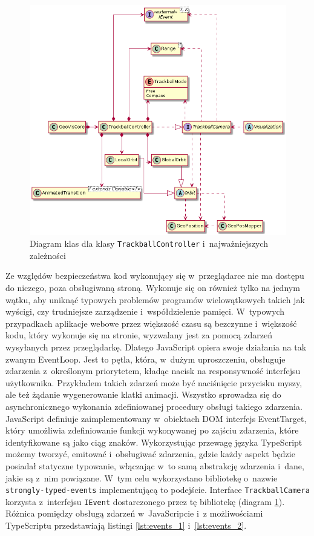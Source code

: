 \begin{figure}
    \centering
    \includegraphics[width=\linewidth]{diagrams/out/c3_trackball.png}
    \caption{Diagram klas dla klasy \texttt{TrackballController} i~najważniejszych zależności}
    \label{fig:c3_trackball}
\end{figure}

Ze względów bezpieczeństwa kod wykonujący się w~przeglądarce nie ma dostępu do niczego, poza obsługiwaną stroną. Wykonuje się on również tylko na jednym wątku, aby uniknąć typowych problemów programów wielowątkowych takich jak wyścigi, czy trudniejsze zarządzenie i~współdzielenie pamięci. W~typowych przypadkach aplikacje webowe przez większość czasu są bezczynne i~większość kodu, który wykonuje się na stronie, wyzwalany jest za pomocą zdarzeń wysyłanych przez przeglądarkę. Dlatego JavaScript opiera swoje działania na tak zwanym EventLoop. Jest to pętla, która, w~dużym uproszczeniu, obsługuje zdarzenia z~określonym priorytetem, kładąc nacisk na responsywność interfejsu użytkownika. Przykładem takich zdarzeń może być naciśnięcie przycisku myszy, ale też żądanie wygenerowanie klatki animacji. Wszystko sprowadza się do asynchronicznego wykonania zdefiniowanej procedury obsługi takiego zdarzenia. JavaScript definiuje zaimplementowany w~obiektach DOM interfejs EventTarget\cite{JsEvents}, który umożliwia zdefiniowanie funkcji wykonywanej po zajściu zdarzenia, które identyfikowane są jako ciąg znaków. Wykorzystując przewagę języka TypeScript możemy tworzyć, emitować i~obsługiwać zdarzenia, gdzie każdy aspekt będzie posiadał statyczne typowanie, włączając w~to samą abstrakcję zdarzenia i~dane, jakie są z~nim powiązane. W~tym celu wykorzystano bibliotekę o~nazwie \texttt{strongly-typed-events}\cite{Events} implementującą to podejście. Interface \texttt{TrackballCamera} korzysta z~interfejsu \texttt{IEvent} dostarczonego przez tę bibliotekę (diagram \ref{fig:c3_trackball}). Różnica pomiędzy obsługą zdarzeń w~JavaScripcie i~z możliwościami TypeScriptu przedstawiają listingi \ref{lst:events_1} i~\ref{lst:events_2}.

